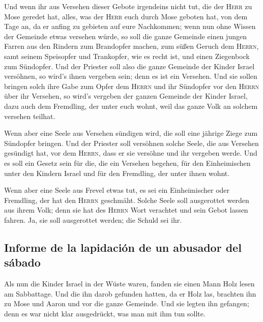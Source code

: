  Und wenn ihr aus Versehen dieser Gebote irgendeins nicht
tut, die der \textsc{Herr} zu Mose geredet hat,  alles,
was der \textsc{Herr} euch durch Mose geboten hat, von dem Tage an, da
er anfing zu gebieten auf eure Nachkommen;  wenn nun ohne
Wissen der Gemeinde etwas versehen würde, so soll die ganze Gemeinde
einen jungen Farren aus den Rindern zum Brandopfer machen, zum süßen
Geruch dem \textsc{Herrn}, samt seinem Speisopfer und Trankopfer, wie es
recht ist, und einen Ziegenbock zum Sündopfer.  Und der
Priester soll also die ganze Gemeinde der Kinder Israel versöhnen, so
wird's ihnen vergeben sein; denn es ist ein Versehen. Und sie sollen
bringen solch ihre Gabe zum Opfer dem \textsc{Herrn} und ihr Sündopfer
vor den \textsc{Herrn} über ihr Versehen,  so wird's
vergeben der ganzen Gemeinde der Kinder Israel, dazu auch dem Fremdling,
der unter euch wohnt, weil das ganze Volk an solchem versehen teilhat.

 Wenn aber eine Seele aus Versehen sündigen wird, die
soll eine jährige Ziege zum Sündopfer bringen.  Und der
Priester soll versöhnen solche Seele, die aus Versehen gesündigt hat,
vor dem \textsc{Herrn}, dass er sie versöhne und ihr vergeben werde.
 Und es soll ein Gesetz sein für die, die ein Versehen
begehen, für den Einheimischen unter den Kindern Israel und für den
Fremdling, der unter ihnen wohnt.

 Wenn aber eine Seele aus Frevel etwas tut, es sei ein
Einheimischer oder Fremdling, der hat den \textsc{Herrn} geschmäht.
Solche Seele soll ausgerottet werden aus ihrem Volk; 
denn sie hat des \textsc{Herrn} Wort verachtet und sein Gebot lassen
fahren. Ja, sie soll ausgerottet werden; die Schuld sei ihr.

\hypertarget{informe-de-la-lapidaciuxf3n-de-un-abusador-del-suxe1bado}{%
\subsection{Informe de la lapidación de un abusador del
sábado}\label{informe-de-la-lapidaciuxf3n-de-un-abusador-del-suxe1bado}}

 Als nun die Kinder Israel in der Wüste waren, fanden sie
einen Mann Holz lesen am Sabbattage.  Und die ihn darob
gefunden hatten, da er Holz las, brachten ihn zu Mose und Aaron und vor
die ganze Gemeinde.  Und sie legten ihn gefangen; denn es
war nicht klar ausgedrückt, was man mit ihm tun sollte.

